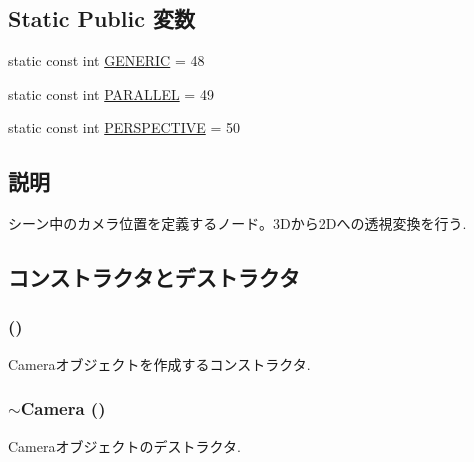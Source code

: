 \subsection*{Static Public 変数}
\begin{CompactItemize}
\item 
static const int \hyperlink{classm3g_1_1Camera_48a4e153c97a1f4890558a77dfe02ca4}{GENERIC} = 48
\item 
static const int \hyperlink{classm3g_1_1Camera_d9630da0e9505afbb107c86229aa2f08}{PARALLEL} = 49
\item 
static const int \hyperlink{classm3g_1_1Camera_e62e72bde93e7d7ceb482e7a8c40dcf5}{PERSPECTIVE} = 50
\end{CompactItemize}


\subsection{説明}
シーン中のカメラ位置を定義するノード。3Dから2Dへの透視変換を行う. 

\subsection{コンストラクタとデストラクタ}
\hypertarget{classm3g_1_1Camera_a3f3efcb2fcc75de885df29041103cd2}{
\subsubsection[{Camera}]{ ()}}
\label{classm3g_1_1Camera_a3f3efcb2fcc75de885df29041103cd2}


Cameraオブジェクトを作成するコンストラクタ. \hypertarget{classm3g_1_1Camera_b921e886e6f14e117eb8099ccb0a3775}{
\subsubsection[{$\sim$Camera}]{\setlength{\rightskip}{0pt plus 5cm}$\sim${\bf Camera} ()}}
\label{classm3g_1_1Camera_b921e886e6f14e117eb8099ccb0a3775}


Cameraオブジェクトのデストラクタ. 

